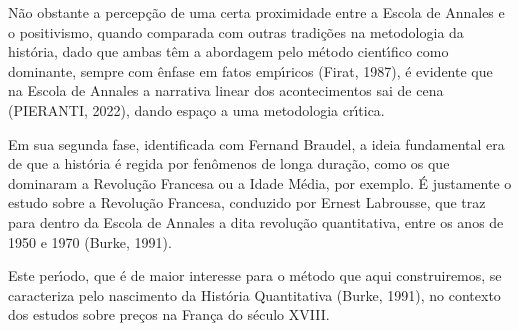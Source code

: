 \documentclass[
12pt,		%
openright,	%
twoside,  %
a4paper,			%
chapter=TITLE,		%
english,			%
french,				%
spanish,			%
brazil				%
]{USPSC-classe/USPSC}
\begin{document}
\noindent\begin{center}\mbox{\centering{}}\end{center}


N\~ao obstante a percep\c{c}\~ao de uma certa proximidade entre a Escola de Annales e o positivismo, quando comparada com outras tradi\c{c}\~oes na metodologia da hist\'oria, dado que ambas t\^em a abordagem pelo m\'etodo cient\'{\i}fico como dominante, sempre com \^enfase em fatos emp\'{\i}ricos (Firat, 1987), \'e evidente que na Escola de Annales a narrativa linear dos acontecimentos sai de cena (PIERANTI, 2022), dando espa\c{c}o a uma metodologia cr\'{\i}tica.








Em sua segunda fase, identificada com Fernand Braudel, a ideia fundamental era de que a hist\'oria \'e regida por fen\^omenos de longa dura\c{c}\~ao, como os que dominaram a Revolu\c{c}\~ao Francesa ou a Idade M\'edia, por exemplo. \'E justamente o estudo sobre a Revolu\c{c}\~ao Francesa, conduzido por Ernest Labrousse, que traz para dentro da Escola de Annales a dita \textquotedbl revolu\c{c}\~ao quantitativa\textquotedbl , entre os anos de 1950 e 1970  (Burke, 1991).








Este per\'{\i}odo, que \'e de maior interesse para o m\'etodo que aqui construiremos, se caracteriza pelo nascimento da Hist\'oria Quantitativa (Burke, 1991), no contexto dos estudos sobre pre\c{c}os na Fran\c{c}a do s\'eculo XVIII.
\end{document}
